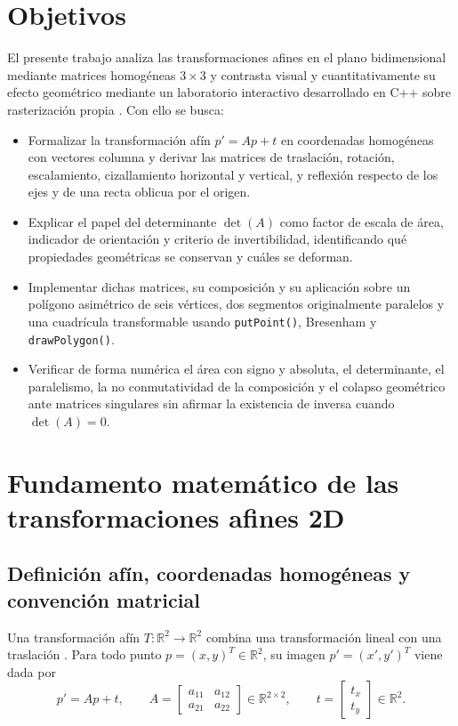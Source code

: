 \documentclass[a4paper,10pt]{article}
\begin{document}
\hypersetup{pageanchor=false}

\hypersetup{pageanchor=true}
\setcounter{page}{1}

\section{Objetivos}

El presente trabajo analiza las transformaciones afines en el plano bidimensional mediante matrices homogéneas $3\times 3$ y contrasta visual y cuantitativamente su efecto geométrico mediante un laboratorio interactivo desarrollado en C++ sobre rasterización propia \citep{hearn2011,shirley2021}. Con ello se busca:

\begin{itemize}
  \item Formalizar la transformación afín $p' = Ap + t$ en coordenadas homogéneas con vectores columna y derivar las matrices de traslación, rotación, escalamiento, cizallamiento horizontal y vertical, y reflexión respecto de los ejes y de una recta oblicua por el origen.
  \item Explicar el papel del determinante $\det(A)$ como factor de escala de área, indicador de orientación y criterio de invertibilidad, identificando qué propiedades geométricas se conservan y cuáles se deforman.
  \item Implementar dichas matrices, su composición y su aplicación sobre un polígono asimétrico de seis vértices, dos segmentos originalmente paralelos y una cuadrícula transformable usando \texttt{putPoint()}, Bresenham y \texttt{drawPolygon()}.
  \item Verificar de forma numérica el área con signo y absoluta, el determinante, el paralelismo, la no conmutatividad de la composición y el colapso geométrico ante matrices singulares sin afirmar la existencia de inversa cuando $\det(A)=0$.
\end{itemize}

\section{Fundamento matemático de las transformaciones afines 2D}

\subsection{Definición afín, coordenadas homogéneas y convención matricial}

Una transformación afín $T:\mathbb{R}^2 \to \mathbb{R}^2$ combina una transformación lineal con una traslación \citep{shirley2021,vince2012}. Para todo punto $p = (x, y)^T \in \mathbb{R}^2$, su imagen $p' = (x', y')^T$ viene dada por
\begin{equation}
  p' = A p + t, \qquad
  A = \begin{bmatrix} a_{11} & a_{12} \\ a_{21} & a_{22} \end{bmatrix} \in \mathbb{R}^{2\times 2}, \qquad
  t = \begin{bmatrix} t_x \\ t_y \end{bmatrix} \in \mathbb{R}^2.
\end{equation}
\end{document}
